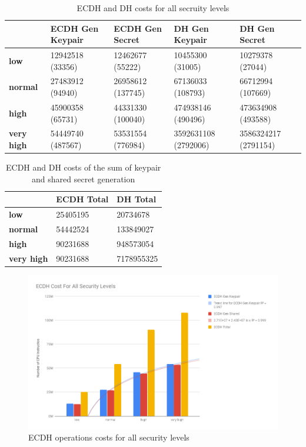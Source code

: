 \documentclass{llncs}
\begin{document}
\begin{table}[]
\begin{tabular}{|l|l|l|l|l|}
\hline
                   & \textbf{ECDH Gen Keypair} & \textbf{ECDH Gen Secret} & \textbf{DH Gen Keypair} & \textbf{DH Gen Secret} \\ \hline
\textbf{low}       & 12942518 (33356)          & 12462677 (55222)         & 10455300 (31005)        & 10279378 (27044)       \\ \hline
\textbf{normal}    & 27483912 (94940)          & 26958612 (137745)        & 67136033 (108793)       & 66712994 (107669)      \\ \hline
\textbf{high}      & 45900358 (65731)          & 44331330 (100040)        & 474938146 (490496)      & 473634908 (493588)     \\ \hline
\textbf{very high} & 54449740 (487567)         & 53531554 (776984)        & 3592631108 (2792006)    & 3586324217 (2791154)   \\ \hline
\end{tabular}
\caption{\label{table:ecdh-dh-costs-all-sls} ECDH and DH costs for all secruity levels}
\end{table}

\begin{table}[]
\begin{tabular}{|l|l|l|}
\hline
                   & \textbf{ECDH Total} & \textbf{DH Total} \\ \hline
\textbf{low}       & 25405195            & 20734678          \\ \hline
\textbf{normal}    & 54442524            & 133849027         \\ \hline
\textbf{high}      & 90231688            & 948573054         \\ \hline
\textbf{very high} & 90231688            & 7178955325        \\ \hline
\end{tabular}
\caption{\label{table:ecdh-dh-costs-total-all-sls} ECDH and DH costs of the sum of keypair and shared secret generation}
\end{table}

\begin{figure}
  \centering
  \includegraphics[width=1.0\textwidth]{img/ecdh_cost_all_sls.png}
  \caption{\label{fig:ecdh-costs-all-sls} ECDH operations costs for all security levels}
\end{figure}
\end{document}
